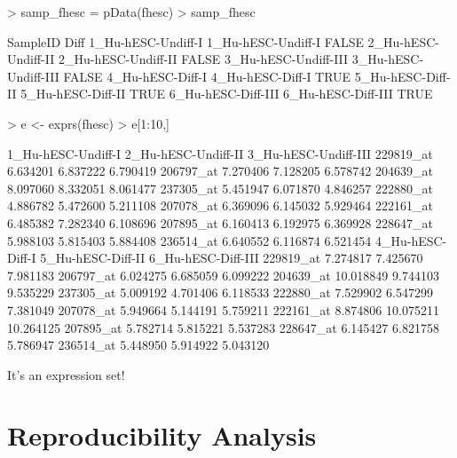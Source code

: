 \documentclass[12pt]{article}
\begin{document}
\begin{Schunk}
\begin{Sinput}
> samp_fhesc = pData(fhesc)
> samp_fhesc
\end{Sinput}
\begin{Soutput}
                                 SampleID  Diff
1_Hu-hESC-Undiff-I     1_Hu-hESC-Undiff-I FALSE
2_Hu-hESC-Undiff-II   2_Hu-hESC-Undiff-II FALSE
3_Hu-hESC-Undiff-III 3_Hu-hESC-Undiff-III FALSE
4_Hu-hESC-Diff-I         4_Hu-hESC-Diff-I  TRUE
5_Hu-hESC-Diff-II       5_Hu-hESC-Diff-II  TRUE
6_Hu-hESC-Diff-III     6_Hu-hESC-Diff-III  TRUE
\end{Soutput}
\begin{Sinput}
> e <- exprs(fhesc)
> e[1:10,]
\end{Sinput}
\begin{Soutput}
          1_Hu-hESC-Undiff-I 2_Hu-hESC-Undiff-II 3_Hu-hESC-Undiff-III
229819_at           6.634201            6.837222             6.790419
206797_at           7.270406            7.128205             6.578742
204639_at           8.097060            8.332051             8.061477
237305_at           5.451947            6.071870             4.846257
222880_at           4.886782            5.472600             5.211108
207078_at           6.369096            6.145032             5.929464
222161_at           6.485382            7.282340             6.108696
207895_at           6.160413            6.192975             6.369928
228647_at           5.988103            5.815403             5.884408
236514_at           6.640552            6.116874             6.521454
          4_Hu-hESC-Diff-I 5_Hu-hESC-Diff-II 6_Hu-hESC-Diff-III
229819_at         7.274817          7.425670           7.981183
206797_at         6.024275          6.685059           6.099222
204639_at        10.018849          9.744103           9.535229
237305_at         5.009192          4.701406           6.118533
222880_at         7.529902          6.547299           7.381049
207078_at         5.949664          5.144191           5.759211
222161_at         8.874806         10.075211          10.264125
207895_at         5.782714          5.815221           5.537283
228647_at         6.145427          6.821758           5.786947
236514_at         5.448950          5.914922           5.043120
\end{Soutput}
\end{Schunk}

It's an expression set!  

\section{Reproducibility Analysis}
\end{document}
